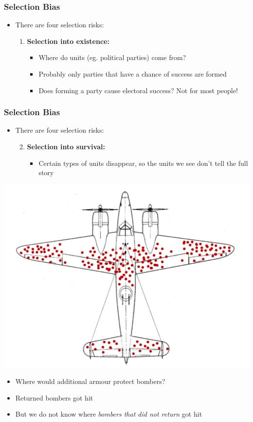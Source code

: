 \documentclass[xcolor=x11names,compress]{beamer}\usepackage[]{graphicx}\usepackage[]{color}
\renewcommand{\(}{\begin{columns}}
\renewcommand{\)}{\end{columns}}
\newcommand{\<}[1]{\begin{column}{#1}}
\renewcommand{\>}{\end{column}}
\begin{document}
\begin{frame}
\frametitle{Selection Bias}
\begin{itemize}
\item There are four selection risks:
\begin{enumerate}
\item \textbf{Selection into existence:}
\begin{itemize}
\item Where do units (eg. political parties) come from?
\item Probably only parties that have a chance of success are formed
\item Does forming a party cause electoral success? Not for most people!
\end{itemize}
\end{enumerate}
\end{itemize}
\end{frame}

\begin{frame}
\frametitle{Selection Bias}
\begin{itemize}
\item There are four selection risks:
\begin{enumerate}
\setcounter{enumi}{1}
\item \textbf{Selection into survival:}
\begin{itemize}
\item Certain types of units disappear, so the units we see don't tell the full story
\end{itemize}
\end{enumerate}
\end{itemize}
\begin{multicols}{2}
\includegraphics[scale=0.25]{Bombers.pdf}
\columnbreak
\begin{itemize}
\item Where would additional armour protect bombers?
\item Returned bombers got hit
\item But we do not know where \textit{bombers that did not return} got hit
\end{itemize}
\end{multicols}
\end{frame}
\end{document}
